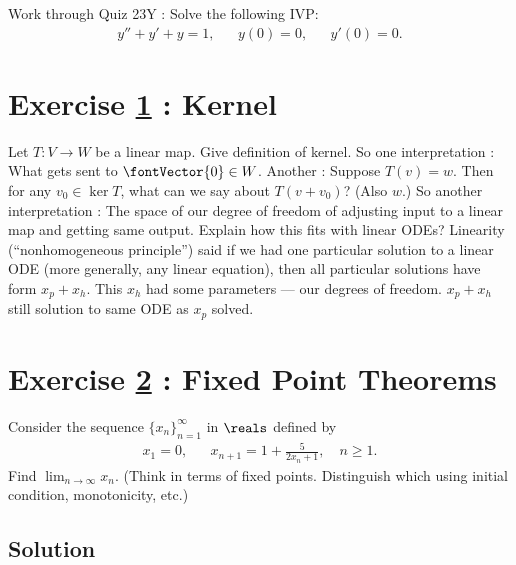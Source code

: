 Work through Quiz 23Y : Solve the following IVP:
\begin{align}
y'' + y' + y
=
1,
&&
y(0)
=
0,
&&
y'(0)
=
0.%
\label{eq : Quiz23 IVP}
\end{align}





%
%
%
%
%

\section{Exercise \ref{sec : Math211 Summer2019 ExamOral Kernel} : Kernel}
\label{sec : Math211 Summer2019 ExamOral Kernel}

Let $T : V \rightarrow W$ be a linear map. Give definition of kernel. So one interpretation : What gets sent to $\fontVector{0} \in W$. Another : Suppose $T(v) = w$. Then for any $v_{0} \in \ker T$, what can we say about $T(v + v_{0})$? (Also $w$.) So another interpretation : The space of our degree of freedom of adjusting input to a linear map and getting same output. Explain how this fits with linear ODEs? Linearity (``nonhomogeneous principle'') said if we had one particular solution to a linear ODE (more generally, any linear equation), then all particular solutions have form $x_{p} + x_{h}$. This $x_{h}$ had some parameters --- our degrees of freedom. $x_{p} + x_{h}$ still solution to same ODE as $x_{p}$ solved.





%
%
%
%
%

\section{Exercise \ref{sec : Math211 Summer2019 ExamOral Fixed Point Theorems} : Fixed Point Theorems}
\label{sec : Math211 Summer2019 ExamOral Fixed Point Theorems}

Consider the sequence $\{ x_{n} \}_{n=1}^{\infty}$ in $\reals$ defined by
\begin{align*}
x_{1} = 0,
&&
x_{n+1} = 1 + \frac{5}{2 x_{n} + 1},
\quad
n \geq 1.
\end{align*}
Find $\lim_{n \rightarrow \infty} x_{n}$. (Think in terms of fixed points. Distinguish which using initial condition, monotonicity, etc.)





\subsection{Solution}

